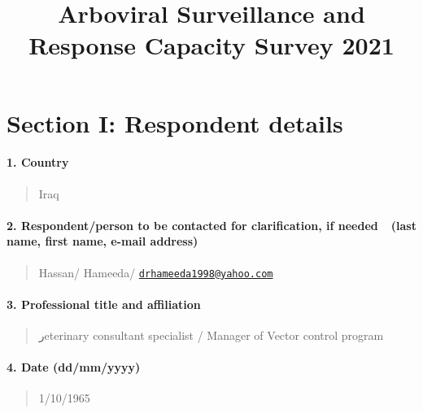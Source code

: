 \documentclass[
]{article}
\title{Arboviral Surveillance and Response Capacity Survey 2021}
\author{}
\date{\vspace{-2.5em}}
\begin{document}
\maketitle

\hypertarget{section-i-respondent-details}{%
\section{Section I: Respondent
details}\label{section-i-respondent-details}}

\hypertarget{country}{%
\paragraph{1. Country}\label{country}}

\begin{quote}
Iraq
\end{quote}

\hypertarget{respondentperson-to-be-contacted-for-clarification-if-needed-last-name-first-name-e-mail-address}{%
\paragraph{2. Respondent/person to be contacted for clarification, if
needed~~(last name, first name, e-mail
address)}\label{respondentperson-to-be-contacted-for-clarification-if-needed-last-name-first-name-e-mail-address}}

\begin{quote}
Hassan/ Hameeda/
\href{mailto:drhameeda1998@yahoo.com}{\nolinkurl{drhameeda1998@yahoo.com}}
\end{quote}

\hypertarget{professional-title-and-affiliation}{%
\paragraph{3. Professional title and
affiliation}\label{professional-title-and-affiliation}}

\begin{quote}
رeterinary consultant specialist / Manager of Vector control program
\end{quote}

\hypertarget{date-ddmmyyyy}{%
\paragraph{4. Date (dd/mm/yyyy)}\label{date-ddmmyyyy}}

\begin{quote}
1/10/1965
\end{quote}
\end{document}
